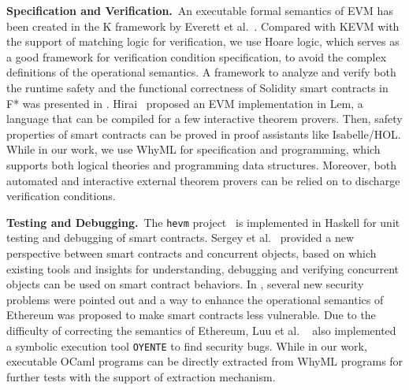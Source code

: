 \documentclass[runningheads]{llncs}
\begin{document}
\noindent\textbf{Specification and Verification.}~An executable formal semantics of EVM has been 
created in the K framework by Everett et al.~\cite{hildenbrandt2017kevm}. 
Compared with KEVM with the support
of matching logic for verification, we use Hoare logic, which serves as a good framework for
verification condition specification, to avoid the complex definitions
of the operational semantics. 
A framework to analyze and verify both the runtime safety and the functional correctness of 
Solidity smart contracts in F*
was presented in \cite{bhargavan2016formal}.
Hirai~\cite{hirai2017defining} proposed an EVM implementation in Lem, a language that can be compiled for 
a few interactive theorem provers. Then, safety properties of smart contracts can be proved in proof assistants like Isabelle/HOL.
While in our work, we use WhyML for specification and programming, which supports both logical theories 
and programming data structures. Moreover, both automated and interactive external theorem provers 
can be relied on to discharge verification conditions. 

\noindent\textbf{Testing and Debugging.}~The \texttt{hevm} project~\cite{hevm} is implemented in Haskell for unit testing and debugging of smart contracts.
Sergey et al.~\cite{sergey2017concurrent} provided a new perspective between smart contracts and concurrent objects,
 based on which existing tools and insights for understanding, 
 debugging and verifying concurrent objects can be used on smart contract behaviors. 
 In \cite{luu2016making}, several new security problems were pointed out and a way to enhance the operational semantics of 
 Ethereum was proposed to make smart contracts less vulnerable. 
 Due to the difficulty of correcting the semantics of Ethereum, Luu et al.
 ~\cite{luu2016making} also implemented a symbolic execution tool \texttt{OYENTE} to find security bugs.
While in our work, executable OCaml programs can be directly extracted from WhyML programs for further tests 
with the support of extraction mechanism.
 
\end{document}
